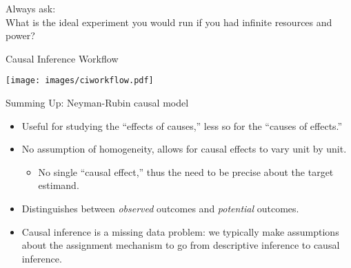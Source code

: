 \documentclass{beamer}
\numberwithin{equation}{section}
\begin{document}
\begin{frame}

\centering
{}\bigskip\bigskip\bigskip

\pause

Always ask:\\\bigskip
What is the \alert{ideal experiment} you would run if you had infinite
resources and power?

\end{frame}

\begin{frame}{Causal Inference Workflow}

\centering
  \texttt{[image: images/ciworkflow.pdf]}

\end{frame}


\begin{frame}{Summing Up: Neyman-Rubin causal model}
\small

\begin{itemize}
\itemsep1pt\parskip0pt
\item
  Useful for studying the ``effects of causes,'' less so for the
  ``causes of effects.''\medskip
\item
  No assumption of homogeneity, allows for causal effects to vary unit
  by unit.\medskip

  \begin{itemize}
  \itemsep1pt\parskip0pt
  \item
    No single ``causal effect,'' thus the need to be precise about the
    target estimand.
  \end{itemize}\medskip
\item
  Distinguishes between \emph{observed} outcomes and \emph{potential}
  outcomes.\medskip
\item
  Causal inference is a missing data problem: we typically make
  assumptions about the assignment mechanism to go from descriptive
  inference to causal inference.
\end{itemize}

\end{frame}
\end{document}
